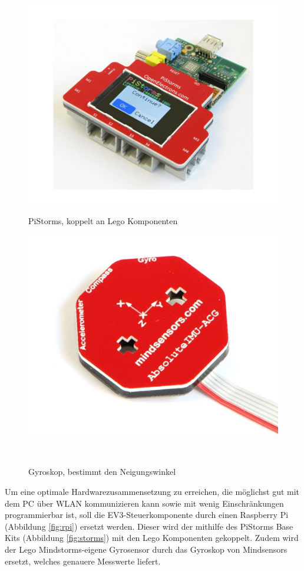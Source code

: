 \documentclass[german,11pt,a4paper]{netforms}
\begin{document}
\begin{figure}[!b]
~ \hfill
{}
  \includegraphics[width=\linewidth]{PiStorms.jpg}
  \caption{PiStorms, koppelt an Lego Komponenten}\label{fig:storms}
\endminipage\hfill
{}
  \includegraphics[width=\linewidth]{gyro.jpg}
  \caption{Gyroskop, bestimmt den Neigungswinkel}\label{fig:gyro}
\endminipage\hfill~
\end{figure}

\newpage

Um eine optimale Hardwarezusammensetzung zu erreichen, die möglichst gut mit dem PC über WLAN kommunizieren kann sowie mit wenig Einschränkungen programmierbar ist, soll die EV3-Steuerkomponente durch einen Raspberry Pi (Abbildung \ref{fig:rpi}) ersetzt werden. Dieser wird der mithilfe des PiStorms Base Kits (Abbildung \ref{fig:storms}) mit den Lego Komponenten gekoppelt. Zudem wird der Lego Mindstorms-eigene Gyrosensor durch das Gyroskop von Mindsensors ersetzt, welches genauere Messwerte liefert. 
\end{document}
